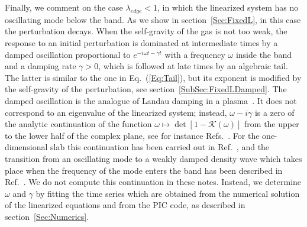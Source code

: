 Finally, we comment on the case $\lambda_{edge} < 1$, in which the linearized system has no oscillating mode below the band. As we show in section~\ref{Sec:FixedL}, in this case the perturbation decays. When the self-gravity of the gas is not too weak, the response to an initial perturbation is dominated at intermediate times by a damped oscillation proportional to $e^{-i\omega t - \gamma t}$ with a frequency $\omega$ inside the band and a damping rate $\gamma > 0$, which is followed at late times by an algebraic tail. The latter is similar to the one in Eq.~(\ref{Eq:Tail}), but its exponent is modified by the self-gravity of the perturbation, see section~\ref{SubSec:FixedLDamped}. The damped oscillation is the analogue of Landau damping in a plasma~\cite{lL46}. It does not correspond to an eigenvalue of the linearized system; instead, $\omega - i\gamma$ is a zero of the analytic continuation of the function $\omega\mapsto \det[1 - \mathcal{K}(\omega)]$ from the upper to the lower half of the complex plane, see for instance Refs.~\cite{BinneyTremaine-Book,mW94,jFsP22}. For the one-dimensional slab this continuation has been carried out in Ref.~\cite{lWgB15}, and the transition from an oscillating mode to a weakly damped density wave which takes place when the frequency of the mode enters the band has been described in Ref.~\cite{pL92}. We do not compute this continuation in these notes. Instead, we determine $\omega$ and $\gamma$ by fitting the time series which are obtained from the numerical solution of the linearized equations and from the PIC code, as described in section~\ref{Sec:Numerics}.
